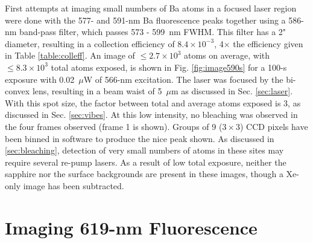 First attempts at imaging small numbers of Ba atoms in a focused laser region were done with the 577- and 591-nm Ba fluorescence peaks together using a 586-nm band-pass filter, which passes 573 - 599~nm FWHM.  This filter has a 2" diameter, resulting in a collection efficiency of $8.4 \times 10^{-3}$, 4$\times$ the efficiency given in Table \ref{table:colleff}.  An image of $\leq 2.7 \times 10^{3}$ atoms on average, with $\leq 8.3 \times 10^{3}$ total atoms exposed, is shown in Fig. \ref{fig:image590s} for a 100-s exposure with 0.02~$\mu$W of 566-nm excitation.  The laser was focused by the bi-convex lens, resulting in a beam waist of 5~$\mu$m as discussed in Sec. \ref{sec:laser}.  With this spot size, the factor between total and average atoms exposed is 3, as discussed in Sec. \ref{sec:vibes}.  At this low intensity, no bleaching was observed in the four frames observed (frame 1 is shown).  Groups of 9 ($3 \times 3$) CCD pixels have been binned in software to produce the nice peak shown.  As discussed in \ref{sec:bleaching}, detection of very small numbers of atoms in these sites may require several re-pump lasers.  As a result of low total exposure, neither the sapphire nor the surface backgrounds are present in these images, though a Xe-only image has been subtracted. 




\section{Imaging 619-nm Fluorescence}
\label{sec:imaging619}

